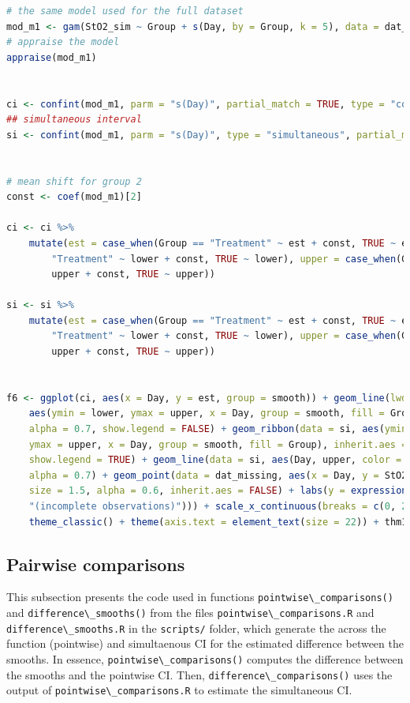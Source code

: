 \documentclass[
]{article}
\newcommand{\passthrough}[1]{#1}
\begin{document}
\begin{lstlisting}[language=R]
# the same model used for the full dataset
mod_m1 <- gam(StO2_sim ~ Group + s(Day, by = Group, k = 5), data = dat_missing)
# appraise the model
appraise(mod_m1)


ci <- confint(mod_m1, parm = "s(Day)", partial_match = TRUE, type = "confidence")
## simultaneous interval
si <- confint(mod_m1, parm = "s(Day)", type = "simultaneous", partial_match = TRUE)


# mean shift for group 2
const <- coef(mod_m1)[2]

ci <- ci %>%
    mutate(est = case_when(Group == "Treatment" ~ est + const, TRUE ~ est), lower = case_when(Group ==
        "Treatment" ~ lower + const, TRUE ~ lower), upper = case_when(Group == "Treatment" ~
        upper + const, TRUE ~ upper))

si <- si %>%
    mutate(est = case_when(Group == "Treatment" ~ est + const, TRUE ~ est), lower = case_when(Group ==
        "Treatment" ~ lower + const, TRUE ~ lower), upper = case_when(Group == "Treatment" ~
        upper + const, TRUE ~ upper))


f6 <- ggplot(ci, aes(x = Day, y = est, group = smooth)) + geom_line(lwd = 1) + geom_ribbon(data = ci,
    aes(ymin = lower, ymax = upper, x = Day, group = smooth, fill = Group), inherit.aes = FALSE,
    alpha = 0.7, show.legend = FALSE) + geom_ribbon(data = si, aes(ymin = lower,
    ymax = upper, x = Day, group = smooth, fill = Group), inherit.aes = FALSE, alpha = 0.4,
    show.legend = TRUE) + geom_line(data = si, aes(Day, upper, color = Group), size = 0.8,
    alpha = 0.7) + geom_point(data = dat_missing, aes(x = Day, y = StO2_sim, color = Group),
    size = 1.5, alpha = 0.6, inherit.aes = FALSE) + labs(y = expression(atop(StO[2],
    "(incomplete observations)"))) + scale_x_continuous(breaks = c(0, 2, 5, 7, 10)) +
    theme_classic() + theme(axis.text = element_text(size = 22)) + thm1
\end{lstlisting}

\hypertarget{pairwise-comparisons}{%
\subsection{Pairwise comparisons}\label{pairwise-comparisons}}

This subsection presents the code used in functions \passthrough{\lstinline!pointwise\_comparisons()!} and \passthrough{\lstinline!difference\_smooths()!} from the files \passthrough{\lstinline!pointwise\_comparisons.R!} and \passthrough{\lstinline!difference\_smooths.R!} in the \passthrough{\lstinline!scripts/!} folder, which generate the across the function (pointwise) and simultaenous CI for the estimated difference between the smooths. In essence, \passthrough{\lstinline!pointwise\_comparisons()!} computes the difference between the smooths and the pointwise CI. Then, \passthrough{\lstinline!difference\_comparisons()!} uses the output of \passthrough{\lstinline!pointwise\_comparisons.R!} to estimate the simultaneous CI.
\end{document}
